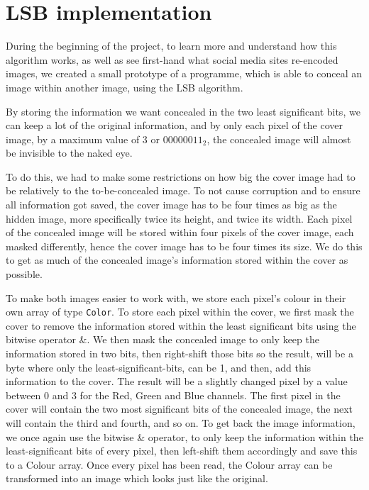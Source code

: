 \section{LSB implementation}
\label{sec:lsb-implementation}
During the beginning of the project, to learn more and understand how this algorithm works, as well as see first-hand what social media sites re-encoded images, we created a small prototype of a programme, which is able to conceal an image within another image, using the LSB algorithm. 

By storing the information we want concealed in the two least significant bits, we can keep a lot of the original information, and by only each pixel of the cover image, by a maximum value of 3 or $00000011_2$, the concealed image will almost be invisible to the naked eye.

To do this, we had to make some restrictions on how big the cover image had to be relatively to the to-be-concealed image. 
To not cause corruption and to ensure all information got saved, the cover image has to be four times as big as the hidden image, more specifically twice its height, and twice its width. 
Each pixel of the concealed image will be stored within four pixels of the cover image, each masked differently, hence the cover image has to be four times its size. 
We do this to get as much of the concealed image's information stored within the cover as possible.

To make both images easier to work with, we store each pixel's colour in their own array of type \lstinline|Color|.
To store each pixel within the cover, we first mask the cover to remove the information stored within the least significant bits using the bitwise operator \&. 
We then mask the concealed image to only keep the information stored in two bits, then right-shift those bits so the result, will be a byte where only the least-significant-bits, can be 1, and then, add this information to the cover. 
The result will be a slightly changed pixel by a value between 0 and 3 for the Red, Green and Blue channels. 
The first pixel in the cover will contain the two most significant bits of the concealed image, the next will contain the third and fourth, and so on. 
To get back the image information, we once again use the bitwise \& operator, to only keep the information within the least-significant bits of every pixel, then left-shift them accordingly and save this to a Colour array. Once every pixel has been read, the Colour array can be transformed into an image which looks just like the original.

